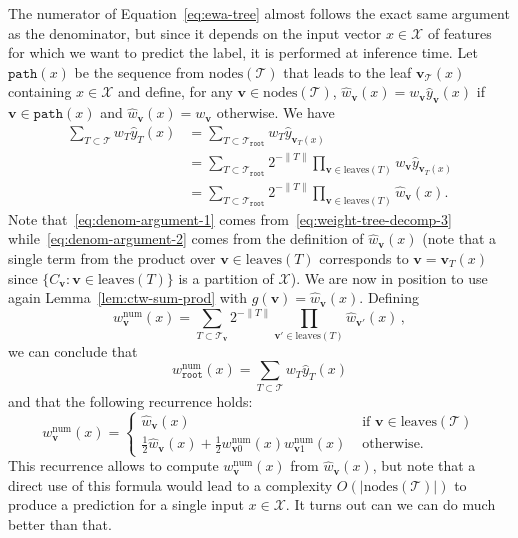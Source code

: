 \documentclass{article}
\newcommand{\cX}{\mathcal X}
\newcommand{\pred}{\widehat{y}}
\newcommand{\node}{\mathbf{v}} %
\newcommand{\nodes}{\mathrm{nodes}} %
\newcommand{\leaves}{\mathrm{leaves}} %
\renewcommand{\root}{\mathtt{root}} %
\newcommand{\tree}{\mathcal{T}} %
\newcommand{\pathpoint}{\mathtt{path}} %
\newcommand{\wnum}{w^{\mathrm{num}}} %
\newcommand{\wpred}{\widehat{w}}
\begin{document}
The numerator of Equation~\eqref{eq:ewa-tree} almost follows the exact same argument as the denominator, but since it depends on the input vector $x \in \cX$ of features for which we want to predict the label, it is performed at inference time.
Let $\pathpoint(x)$ be the sequence from $\nodes(\tree)$ that leads to the leaf $\node_{\tree}(x)$ containing $x \in \cX$ and define, for any $\node \in \nodes(\tree)$, $\wpred_{\node}(x) = w_\node \pred_\node(x)$ if $\node \in \pathpoint(x)$ and  $\wpred_{\node}(x) = w_\node$ otherwise.
We have
\begin{align}
    \nonumber
    \sum_{T \subset \tree} w_T \pred_{T} (x) &= \sum_{T \subset \tree_\root} w_{T} \pred_{\node_T(x)} \\
    \label{eq:denom-argument-1}
    &=  \sum_{T \subset \tree_\root} 2^{-\| T \|} \prod_{\node \in \leaves(T)} w_{\node} \pred_{\node_T(x)} \\
    \label{eq:denom-argument-2}
    &= \sum_{T \subset \tree_\root} 2^{-\| T \|} \prod_{\node \in \leaves(T)} \wpred_{\node}(x).
\end{align}
Note that~\eqref{eq:denom-argument-1} comes from~\eqref{eq:weight-tree-decomp-3} while~\eqref{eq:denom-argument-2} comes from the definition of $\wpred_{\node}(x)$ (note that a single term from the product over $\node \in \leaves(T)$ corresponds to $\node = \node_T(x)$ since $\{ C_\node : \node \in \leaves(T) \}$ is a partition of $\cX$).
We are now in position to use again Lemma~\ref{lem:ctw-sum-prod} with $g(\node) = \wpred_{\node}(x)$.
Defining
\begin{equation*}
\wnum_\node(x)
= \sum_{T \subset \tree_\node} 2^{-\| T \|}
\prod_{\node' \in \leaves(T)} \wpred_{\node'}(x) \, ,
\end{equation*}
we can conclude that 
\begin{equation}
    \label{eq:wnum-root}
    \wnum_\root(x) = \sum_{T \subset \tree} w_T \pred_{T} (x)
\end{equation}
and that the following recurrence holds:
\begin{equation}
  \label{eq:wnum-recursion1}
  \wnum_{\node}(x) =
  \begin{cases}
      \wpred_{\node}(x) & \text{ if } \node \in \leaves(\tree) \\
      \frac{1}{2} \wpred_{\node}(x) + \frac{1}{2} \wnum_{\node 0}(x) \wnum_{\node 1}(x) &\text{ otherwise}.
  \end{cases}
\end{equation}
This recurrence allows to compute $\wnum_{\node}(x)$ from $\wpred_{\node}(x)$, but note that a direct use of this formula would lead to a complexity $O(|\nodes(\tree)|)$ to produce a prediction for a single input $x \in \cX$. 
It turns out can we can do much better than that.
\end{document}
